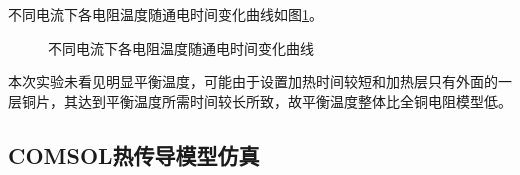 \documentclass[10pt,a4paper,twoside,UTF8]{ctexart}
\begin{document}
不同电流下各电阻温度随通电时间变化曲线如图\ref{fig: copper layer}。
\begin{figure}[H]
	\centering

	\caption{不同电流下各电阻温度随通电时间变化曲线}
	\label{fig: copper layer}
\end{figure}

本次实验未看见明显平衡温度，可能由于设置加热时间较短和加热层只有外面的一层铜片，其达到平衡温度所需时间较长所致，故平衡温度整体比全铜电阻模型低。

\subsection{COMSOL热传导模型仿真}
\end{document}
